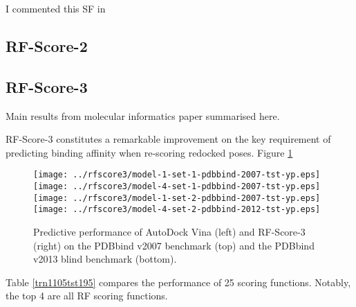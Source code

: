 \documentclass{llncs}
\begin{document}
I commented this SF in \cite{1370}

\subsection{RF-Score-2}

\cite{1370}

\subsection{RF-Score-3}

Main results from molecular informatics paper summarised here.

RF-Score-3 constitutes a remarkable improvement on the key requirement of predicting binding affinity when re-scoring redocked poses. Figure \ref{partition1+5stat}

\begin{figure}
\subfloat
{
  \texttt{[image: ../rfscore3/model-1-set-1-pdbbind-2007-tst-yp.eps]}
}
\subfloat
{
  \texttt{[image: ../rfscore3/model-4-set-1-pdbbind-2007-tst-yp.eps]}
}
\\
\subfloat
{
  \texttt{[image: ../rfscore3/model-1-set-2-pdbbind-2007-tst-yp.eps]}
}
\subfloat
{
  \texttt{[image: ../rfscore3/model-4-set-2-pdbbind-2012-tst-yp.eps]}
}
\caption{Predictive performance of AutoDock Vina (left) and RF-Score-3 (right) on the PDBbind v2007 benchmark (top) and the PDBbind v2013 blind benchmark (bottom).}
\label{partition1+5stat}
\end{figure}

Table \ref{trn1105tst195} compares the performance of 25 scoring functions. Notably, the top 4 are all RF scoring functions.
\end{document}
